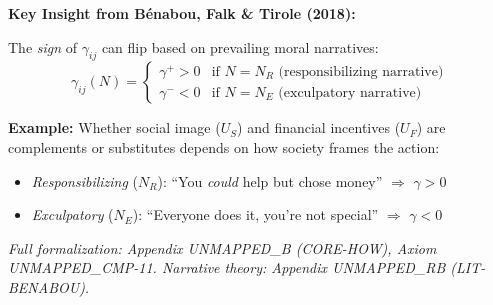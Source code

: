 \begin{tcolorbox}[
    colback=green!5!white,
    colframe=green!60!black,
    title={\textbf{Advanced: Narrative Modulation of $\gamma$ (Axiom UNMAPPED_CMP-11)}},
    fonttitle=\bfseries
]
\textbf{Key Insight from Bénabou, Falk \& Tirole (2018):}

The \textit{sign} of $\gamma_{ij}$ can flip based on prevailing moral narratives:
\begin{equation}
\gamma_{ij}(N) = \begin{cases}
\gamma^{+} > 0 & \text{if } N = N_R \text{ (responsibilizing narrative)} \\
\gamma^{-} < 0 & \text{if } N = N_E \text{ (exculpatory narrative)}
\end{cases}
\end{equation}

\textbf{Example:} Whether social image ($U_S$) and financial incentives ($U_F$) are complements or substitutes depends on how society frames the action:
\begin{itemize}[nosep]
    \item \textit{Responsibilizing} ($N_R$): ``You \textit{could} help but chose money'' $\Rightarrow$ $\gamma > 0$
    \item \textit{Exculpatory} ($N_E$): ``Everyone does it, you're not special'' $\Rightarrow$ $\gamma < 0$
\end{itemize}

\medskip
\textit{Full formalization: Appendix UNMAPPED_B (CORE-HOW), Axiom UNMAPPED_CMP-11. Narrative theory: Appendix UNMAPPED_RB (LIT-BENABOU).}
\end{tcolorbox}

